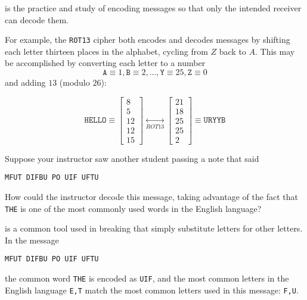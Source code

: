 \begin{applicationActivities}

\begin{definition}
 is the practice and study of encoding messages
so that only the intended receiver can decode them.

For example, the \texttt{ROT13} cipher both encodes and decodes
messages by shifting each letter thirteen places in the alphabet,
cycling from \(Z\) back to \(A\). This may be accomplished by
converting each letter to a number 
\[
\mathtt{A}\equiv 1,\mathtt{B}\equiv 2,\dots,
\mathtt{Y}\equiv 25,\mathtt{Z}\equiv 0
\]
and adding \(13\) (modulo \(26\)):

\[
\mathtt{HELLO} \equiv
\begin{bmatrix}8\\5\\12\\12\\15\end{bmatrix}
\underset{ROT13}{\leftrightarrow}
\begin{bmatrix}21\\18\\25\\25\\2\end{bmatrix}
\equiv
\mathtt{URYYB}
\]
\end{definition}
 
\begin{activity}{10}
Suppose your instructor saw another student passing a note that said
\begin{center}\texttt{MFUT DIFBU PO UIF UFTU}\end{center}

How could the instructor decode this message, taking advantage of the 
fact that \texttt{THE} is one of the most commonly used words
in the English language?
\end{activity}

\begin{observation}
 is a common tool used in breaking
that simply substitute letters for other letters. In the message 
\begin{center}\texttt{MFUT DIFBU PO UIF UFTU}\end{center}
the common word \texttt{THE} is encoded as \texttt{UIF}, 
and the most common letters in the English language \texttt{E,T}
match the most common letters used in this message: \texttt{F,U}.


\end{observation}
\end{applicationActivities}
